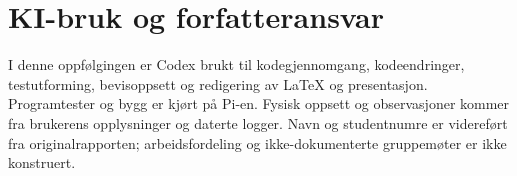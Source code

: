 \section{KI-bruk og forfatteransvar}
I denne oppfølgingen er Codex brukt til kodegjennomgang, kodeendringer,
testutforming, bevisoppsett og redigering av LaTeX og presentasjon.
Programtester og bygg er kjørt på Pi-en. Fysisk oppsett og observasjoner
kommer fra brukerens opplysninger og daterte logger.
Navn og studentnumre er videreført fra originalrapporten; arbeidsfordeling
og ikke-dokumenterte gruppemøter er ikke konstruert.
